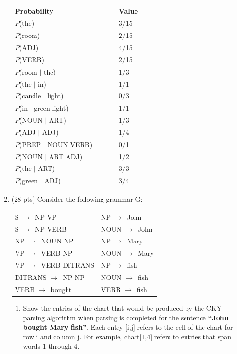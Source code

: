 \documentclass[11pt]{article}
\newcommand{\ra}{$\rightarrow$~}
\begin{document}
\begin{enumerate}
 \begin{center}
 \begin{tabular}{|l|l|} \hline
 \textbf{Probability~~~~~~~~~~~~~~~} & \textbf{Value~~~~~~~~~~~~~~~~~} \\ \hline
 $P$(the) & 3/15 \\
 $P$(room) & 2/15 \\
 $P$(ADJ) & 4/15 \\
 $P$(VERB) & 2/15 \\
 $P$(room $\mid$ the) & 1/3 \\
 $P$(the $\mid$ in) & 1/1 \\
 $P$(candle $\mid$ light) & 0/3 \\
 $P$(in $\mid$ green light) & 1/1 \\
 $P$(NOUN $\mid$ ART) & 1/3 \\
 $P$(ADJ $\mid$ ADJ) & 1/4 \\
 $P$(PREP $\mid$ NOUN VERB) & 0/1 \\
 $P$(NOUN $\mid$ ART ADJ) & 1/2 \\
 $P$(the $\mid$ ART) & 3/3 \\
 $P$(green $\mid$ ADJ) & 3/4 \\ \hline
 \end{tabular}
 \end{center}
 

\newpage

\item (28 pts) Consider the following grammar G: 

\begin{center}
\begin{tabular}{|ll|} \hline
S \ra NP VP &      NP \ra John \\
S \ra NP VERB   &  NOUN \ra John \\   
NP \ra NOUN NP &  NP \ra Mary \\
VP \ra VERB NP &  NOUN \ra Mary \\
VP \ra VERB DITRANS & NP \ra fish \\
DITRANS \ra NP NP & NOUN \ra fish \\
VERB \ra bought & VERB \ra fish \\ \hline
\end{tabular}
\end{center}

\begin{enumerate}

\item Show the entries of the chart that would be produced by the
CKY parsing algorithm when parsing is completed for the sentence
{\bf ``John bought Mary fish''}.  Each entry [i,j] refers to the cell of the
chart for row i and column j. For example, chart[1,4]
refers to entries that span words 1 through 4.  \\


\end{enumerate}
\end{enumerate}
\end{document}
